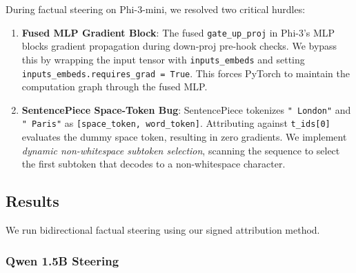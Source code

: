 \documentclass[11pt]{article}
\begin{document}
During factual steering on Phi-3-mini, we resolved two critical hurdles:
\begin{enumerate}
    \item \textbf{Fused MLP Gradient Block}: The fused \texttt{gate\_up\_proj} in Phi-3's MLP blocks gradient propagation during down-proj pre-hook checks. We bypass this by wrapping the input tensor with \texttt{inputs\_embeds} and setting \texttt{inputs\_embeds.requires\_grad = True}. This forces PyTorch to maintain the computation graph through the fused MLP.
    \item \textbf{SentencePiece Space-Token Bug}: SentencePiece tokenizes \texttt{" London"} and \texttt{" Paris"} as \texttt{[space\_token, word\_token]}. Attributing against \texttt{t\_ids[0]} evaluates the dummy space token, resulting in zero gradients. We implement \textit{dynamic non-whitespace subtoken selection}, scanning the sequence to select the first subtoken that decodes to a non-whitespace character.
\end{enumerate}

\subsection{Results}

We run bidirectional factual steering using our signed attribution method.

\subsubsection{Qwen 1.5B Steering}

\begin{table}[h]
\centering
\caption{Qwen 1.5B Bidirectional Factual Steering}
\label{tab:qwen_steering}
\end{table}
\end{document}
